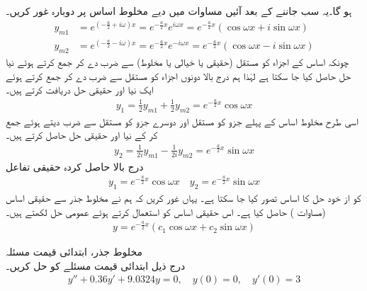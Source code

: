 ہو گا۔یہ سب جاننے کے بعد آئیں مساوات  میں دیے مخلوط اساس پر دوبارہ غور کریں۔
\begin{align*}
y_{m1}&=e^{(-\frac{a}{2}+i\omega)x}=e^{-\frac{a}{2}x}e^{i\omega x}=e^{-\frac{a}{2}x} (\cos \omega x+i\sin \omega x)\\
y_{m2}&=e^{(-\frac{a}{2}-i\omega)x}=e^{-\frac{a}{2}x}e^{-i\omega x}=e^{-\frac{a}{2}x} (\cos \omega x-i\sin \omega x)
\end{align*}
چونکہ اساس کے اجزاء کو مستقل (حقیقی یا خیالی یا مخلوط) سے ضرب دے کر جمع کرتے ہوئے نیا حل حاصل کیا جا سکتا ہے لہٰذا ہم درج بالا دونوں اجزاء کو مستقل  سے ضرب دے کر جمع کرتے ہوئے ایک نیا اور حقیقی حل  دریافت کرتے ہیں۔
\begin{align*}
y_1=\frac{1}{2}y_{m1}+\frac{1}{2}y_{m2}=e^{-\frac{a}{2}x} \cos \omega x
\end{align*}
اسی طرح مخلوط اساس کے پہلے جزو  کو مستقل  اور دوسرے جزو کو مستقل  سے ضرب دیتے ہوئے جمع کر کے نیا اور حقیقی حل  حاصل کرتے ہیں۔
\begin{align*}
y_2=\frac{1}{2i}y_{m1}-\frac{1}{2i}y_{m2}=e^{-\frac{a}{2}x} \sin \omega x
\end{align*}
درج بالا حاصل کردہ حقیقی تفاعل 
\begin{align}\label{مساوات_سادہ_دو_درجی_مخلوط_اساس_ب}
y_1=e^{-\frac{a}{2}x} \cos \omega x\quad y_2=e^{-\frac{a}{2}x} \sin \omega x
\end{align}
 کو از خود حل کا اساس تصور کیا جا سکتا ہے۔ یہاں غور کریں کہ ہم نے مخلوط جذر  سے حقیقی اساس  (مساوات ) حاصل کیا ہے۔ اس حقیقی اساس کو استعمال کرتے ہوئے عمومی حل لکھتے ہیں۔
\begin{align}
y=e^{-\frac{a}{2}x} (c_1 \cos \omega x+c_2 \sin \omega x)
\end{align}

\quad مخلوط جذر، ابتدائی قیمت مسئلہ\\
درج ذیل ابتدائی قیمت مسئلے کو حل کریں۔
\begin{align*}
y''+0.36y'+9.0324y=0,\quad y(0)=0, \quad y'(0)=3
\end{align*}

